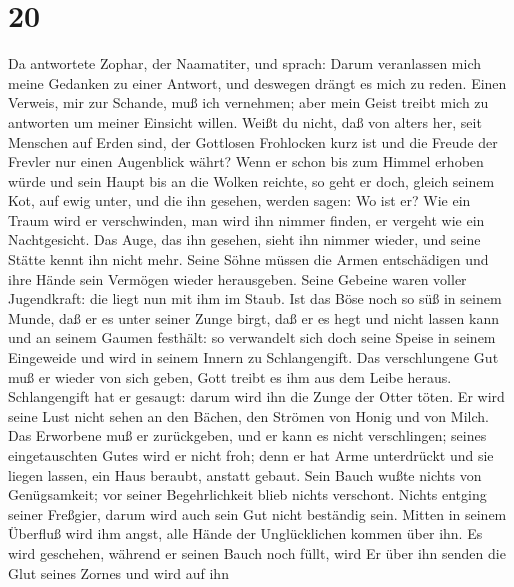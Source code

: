 \hypertarget{section-19}{%
\section{20}\label{section-19}}

 Da antwortete Zophar, der Naamatiter, und sprach:
 Darum veranlassen mich meine Gedanken zu einer Antwort,
und deswegen drängt es mich zu reden.  Einen Verweis, mir
zur Schande, muß ich vernehmen; aber mein Geist treibt mich zu antworten
um meiner Einsicht willen.  Weißt du nicht, daß von alters
her, seit Menschen auf Erden sind,  der Gottlosen
Frohlocken kurz ist und die Freude der Frevler nur einen Augenblick
währt?  Wenn er schon bis zum Himmel erhoben würde und
sein Haupt bis an die Wolken reichte,  so geht er doch,
gleich seinem Kot, auf ewig unter, und die ihn gesehen, werden sagen: Wo
ist er?  Wie ein Traum wird er verschwinden, man wird ihn
nimmer finden, er vergeht wie ein Nachtgesicht.  Das Auge,
das ihn gesehen, sieht ihn nimmer wieder, und seine Stätte kennt ihn
nicht mehr.  Seine Söhne müssen die Armen entschädigen
und ihre Hände sein Vermögen wieder herausgeben.  Seine
Gebeine waren voller Jugendkraft: die liegt nun mit ihm im Staub.
 Ist das Böse noch so süß in seinem Munde, daß er es
unter seiner Zunge birgt,  daß er es hegt und nicht
lassen kann und an seinem Gaumen festhält:  so verwandelt
sich doch seine Speise in seinem Eingeweide und wird in seinem Innern zu
Schlangengift.  Das verschlungene Gut muß er wieder von
sich geben, Gott treibt es ihm aus dem Leibe heraus. 
Schlangengift hat er gesaugt: darum wird ihn die Zunge der Otter töten.
 Er wird seine Lust nicht sehen an den Bächen, den
Strömen von Honig und von Milch.  Das Erworbene muß er
zurückgeben, und er kann es nicht verschlingen; seines eingetauschten
Gutes wird er nicht froh;  denn er hat Arme unterdrückt
und sie liegen lassen, ein Haus beraubt, anstatt gebaut. 
Sein Bauch wußte nichts von Genügsamkeit; vor seiner Begehrlichkeit
blieb nichts verschont.  Nichts entging seiner Freßgier,
darum wird auch sein Gut nicht beständig sein.  Mitten in
seinem Überfluß wird ihm angst, alle Hände der Unglücklichen kommen über
ihn.  Es wird geschehen, während er seinen Bauch noch
füllt, wird Er über ihn senden die Glut seines Zornes und wird auf ihn

